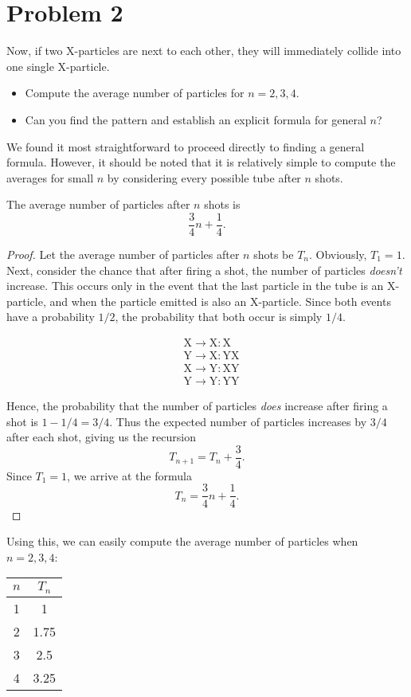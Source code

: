 \section{Problem 2}
\hypertarget{p2}{}
Now, if two X-particles are next to each other, they will immediately collide into one single X-particle.
\begin{itemize}
  \item Compute the average number of particles for $n = 2, 3, 4$.
  \item Can you find the pattern and establish an explicit formula for general $n$?
\end{itemize}

We found it most straightforward to proceed directly to finding a general formula. However, it should be noted that it is relatively simple to compute the averages for small $n$ by considering every possible tube after $n$ shots.

\begin{theorem}\label{thm:2}
  The average number of particles after $n$ shots is \[
  \frac{3}{4}n + \frac{1}{4}
  .\]
\end{theorem}
\begin{proof}
  Let the average number of particles after $n$ shots be $T_n$. Obviously, $T_1 = 1$. Next, consider the chance that after firing a shot, the number of particles \emph{doesn't} increase. This occurs only in the event that the last particle in the tube is an X-particle, and when the particle emitted is also an X-particle. Since both events have a probability $1 / 2$, the probability that both occur is simply $1 / 4$. 
  \begin{figure}[H]
    \vspace{-1.5em}
    \begin{align*}
    &\text{X} \to \text{X}: \text{X} \\
    &\text{Y} \to \text{X}: \text{YX} \\
    &\text{X} \to \text{Y}: \text{XY} \\
    &\text{Y} \to \text{Y}: \text{YY}
    \end{align*}
    \vspace{-3em}
  \end{figure}
  Hence, the probability that the number of particles \emph{does} increase after firing a shot is $1 -1 / 4 = 3 / 4$. Thus the expected number of particles increases by $3 / 4$ after each shot, giving us the recursion \[
    T_{n+1} = T_{n} + \frac{3}{4}
  .\] Since $T_1 = 1$, we arrive at the formula \[
    T_{n} = \frac{3}{4}n + \frac{1}{4} \tag*{\qedhere}
  .\] 
\end{proof}

Using this, we can easily compute the average number of particles when $n = 2, 3, 4$:
\begin{table}[H]
  \centering
  \begin{tabular}{cc}
    \toprule
    $n$ & $T_n$ \\
    \midrule
    1 & 1 \\
    2 & 1.75 \\
    3 & 2.5 \\
    4 & 3.25 \\
    \bottomrule
  \end{tabular}
\end{table}

